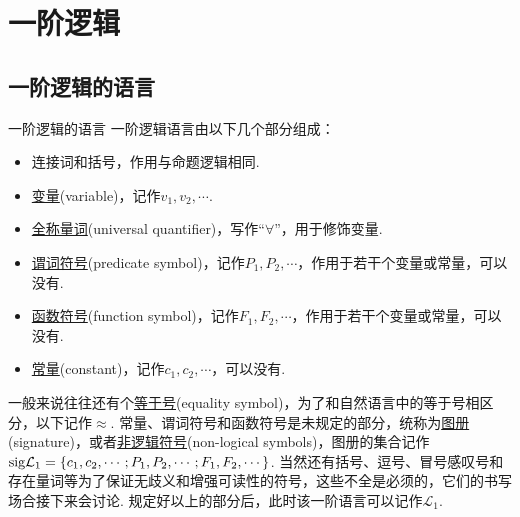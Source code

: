 \documentclass[main.tex]{subfiles}
\begin{document}
\section{一阶逻辑}

\subsection{一阶逻辑的语言}

\begin{definition}{一阶逻辑的语言}
    一阶逻辑语言由以下几个部分组成：
    \begin{itemize}
        \item 连接词和括号，作用与命题逻辑相同.
        \item \uline{变量}(variable)，记作\(v_1, v_2, \cdots\).
        \item \uline{全称量词}(universal quantifier)，写作“\(\forall\)”，用于修饰变量.
        \item \uline{谓词符号}(predicate symbol)，记作\(P_1,P_2,\cdots\)，作用于若干个变量或常量，可以没有.
        \item \uline{函数符号}(function symbol)，记作\(F_1,F_2,\cdots\)，作用于若干个变量或常量，可以没有.
        \item \uline{常量}(constant)，记作\(c_1,c_2,\cdots\)，可以没有.
    \end{itemize}
    一般来说往往还有个\uline{等于号}(equality symbol)，为了和自然语言中的等于号相区分，以下记作\(\approx\). \newline
    常量、谓词符号和函数符号是未规定的部分，统称为\uline{图册}(signature)，或者\uline{非逻辑符号}(non-logical symbols)，图册的集合记作\({\rm sig}\mathcal{L}_1 = \{ c_1, c_2, \cdots; P_1, P_2, \cdots; F_1, F_2, \cdots \}\). \newline
    当然还有括号、逗号、冒号感叹号和存在量词等为了保证无歧义和增强可读性的符号，这些不全是必须的，它们的书写场合接下来会讨论. \newline
    规定好以上的部分后，此时该一阶语言可以记作\(\mathcal{L}_1\).
\end{definition}
\end{document}
